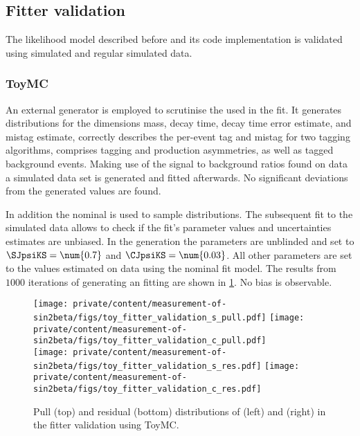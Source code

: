 \subsection{Fitter validation}
\label{sec:measurement_of_sin2beta:likelihood_fit:validation}

The likelihood model described before and its code implementation is validated
using \ToyMC simulated and regular \MC simulated data.

\subsubsection{\Acl{ToyMC}}
\label{sec:measurement_of_sin2beta:likelihood_fit:validation:toy_mc}

An external \ToyMC generator \cite{wishahi:2015bhf} is employed to scrutinise
the \PDF used in the fit. It generates distributions for the dimensions mass,
decay time, decay time error estimate, and mistag estimate, correctly describes
the per-event tag and mistag for two tagging algorithms, comprises tagging and
production asymmetries, as well as tagged background events. Making use of the
signal to background ratios found on data a simulated data set is generated and
fitted afterwards. No significant deviations from the generated values are
found.

In addition the nominal \PDF is used to sample distributions. The subsequent fit
to the simulated data allows to check if the fit's parameter values and
uncertainties estimates are unbiased. In the generation the \CP parameters are
unblinded and set to $\SJpsiKS = \num{0.7}$ and $\CJpsiKS = \num{0.03}$. All
other parameters are set to the values estimated on data using the nominal fit
model. The results from $\num{1000}$ iterations of generating an fitting are
shown in \cref{fig:measurement_of_sin2beta:likelihood_fit:validation:toy_mc}. No
bias is observable.
%
\begin{figure}[ht]
\centering
\texttt{[image: private/content/measurement-of-sin2beta/figs/toy\_fitter\_validation\_s\_pull.pdf]}
\texttt{[image: private/content/measurement-of-sin2beta/figs/toy\_fitter\_validation\_c\_pull.pdf]}     \\
\texttt{[image: private/content/measurement-of-sin2beta/figs/toy\_fitter\_validation\_s\_res.pdf]}
\texttt{[image: private/content/measurement-of-sin2beta/figs/toy\_fitter\_validation\_c\_res.pdf]}
\caption{Pull (top) and residual (bottom) distributions of \SJpsiKS (left) and
\CJpsiKS (right) in the fitter validation using \ac{ToyMC}.}
\label{fig:measurement_of_sin2beta:likelihood_fit:validation:toy_mc}
\end{figure}


